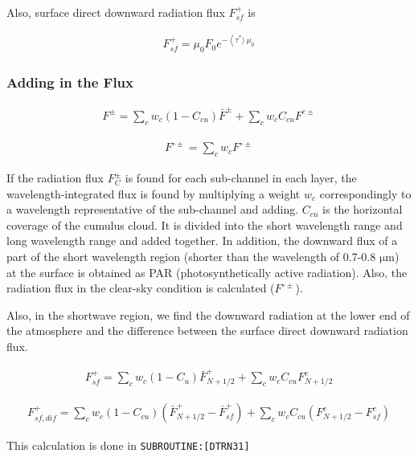 Also, surface direct downward radiation flux \(F_{s f}^{+}\) is

\begin{eqnarray}
F_{s f}^{+}=\mu_{0} F_{0} e^{-\left\langle\tau^{*}\rangle\ \mu_{0}\right.}
\end{eqnarray}

\hypertarget{adding-in-the-flux}{%
\subsubsection{Adding in the Flux}\label{adding-in-the-flux}}

\begin{eqnarray}
F^{\pm}=\sum_{c} w_{c}\left(1-C_{c u}\right) \bar{F}^{\pm}+\sum_{c} w_{c} C_{c u} F^{c \pm}
\end{eqnarray}

\begin{eqnarray}
F^{\circ \pm}=\sum_{c} w_{c} F^{\circ \pm}
\end{eqnarray}

If the radiation flux \(F_{C}^{\pm}\) is found for each sub-channel in
each layer, the wavelength-integrated flux is found by multiplying a
weight \(w_c\) correspondingly to a wavelength representative of the
sub-channel and adding. \(C_{cu}\) is the horizontal coverage of the
cumulus cloud. It is divided into the short wavelength range and long
wavelength range and added together. In addition, the downward flux of a
part of the short wavelength region (shorter than the wavelength of
0.7-0.8 \(\mathrm{{\mu}m}\)) at the surface is obtained as PAR
(photosynthetically active radiation). Also, the radiation flux in the
clear-sky condition is calculated (\(F^{\circ \pm}\)).

Also, in the shortwave region, we find the downward radiation at the
lower end of the atmosphere and the difference between the surface
direct downward radiation flux.

\begin{eqnarray}
F_{s f}^{+}=\sum_{c} w_{c}\left(1-C_{u}\right) \bar{F}_{N+1 / 2}^{+}+\sum_{c} w_{c} C_{c u} F_{N+1 / 2}^{c}
\end{eqnarray}

\begin{eqnarray}
F_{s f, d i f}^{+}=\sum_{c} w_{c}\left(1-C_{c u}\right)\left(\bar{F}_{N+1 / 2}^{+}-\bar{F}_{s f}^{+}\right)+\sum_{c} w_{c} C_{c u}\left(F_{N+1 / 2}^{c}-F_{s f}^{c}\right)
\end{eqnarray}

This calculation is done in \texttt{SUBROUTINE:{[}DTRN31{]}}

